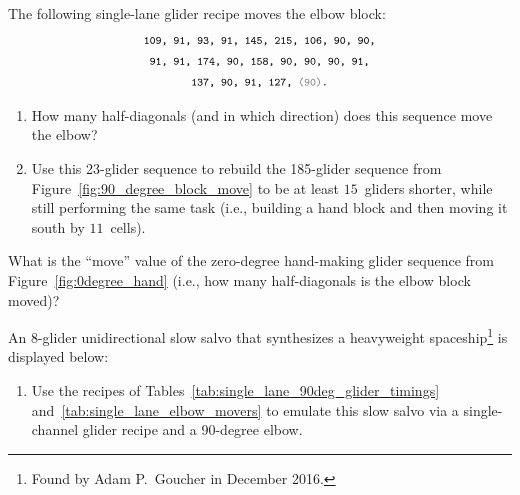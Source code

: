 \begin{multicols}{2}
	
	\mfilbreak
	
	
	\begin{problem}\label{exer:push_elbow_longer}
		The following single-lane glider recipe moves the elbow block:
		\begin{align*}
		& \text{\texttt{\footnotesize 109, 91, 93, 91, 145, 215, 106, 90, 90,}} \\
		& \text{\texttt{\footnotesize~91, 91, 174, 90, 158, 90, 90, 90, 91,}} \\
		& \text{\texttt{\footnotesize~~~~~~~~137, 90, 91, 127, {\color{gray}(90)}.}}
		\end{align*}
		
		\begin{enumerate}[label=\bf\color{ocre}(\alph*)]
			\item How many half-diagonals (and in which direction) does this sequence move the elbow?
			
			\item Use this 23-glider sequence to rebuild the 185-glider sequence from Figure~\ref{fig:90_degree_block_move} to be at least $15$~gliders shorter, while still performing the same task (i.e., building a hand block and then moving it south by $11$~cells).
		\end{enumerate}
	\end{problem}
	
	
	\mfilbreak
	
	
	\begin{problemstar}\label{exer:0degree_hand_move}
		What is the ``move'' value of the zero-degree hand-making glider sequence from Figure~\ref{fig:0degree_hand} (i.e., how many half-diagonals is the elbow block moved)?
	\end{problemstar}
	
	
	\mfilbreak
	
	
	\begin{problem}\label{exer:exercise_hwss_slow_salvo}
		An 8-glider unidirectional slow salvo that synthesizes a heavyweight spaceship\footnote{Found by Adam P.~Goucher in December 2016.} is displayed below:
		
		\noindent\begin{center}
		\end{center}
		
		\begin{enumerate}[label=\bf\color{ocre}(\alph*)]
			\item Use the recipes of Tables~\ref{tab:single_lane_90deg_glider_timings} and~\ref{tab:single_lane_elbow_movers} to emulate this slow salvo via a single-channel glider recipe and a 90-degree elbow.
			

\end{enumerate}
\end{problem}
\end{multicols}
